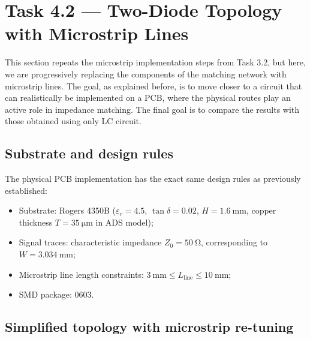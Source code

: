 
\section{Task 4.2 --- Two-Diode Topology with Microstrip Lines}
\label{sec:task4_2}

This section repeats the microstrip implementation steps from Task 3.2, but here, we are progressively replacing the components of the matching network with microstrip lines. The goal, as explained before, is to move closer to a circuit that can realistically be implemented on a PCB, where the physical routes play an active role in impedance matching. The final goal is to compare the results with those obtained using only LC circuit.

\subsection{Substrate and design rules}
\label{subsec:2d_design_rules}

The physical PCB implementation has the exact same design rules as previously established:
%
\begin{itemize}
    \item Substrate: Rogers 4350B ($\varepsilon_r = 4.5$,
          $\tan\delta = 0.02$, $H = \SI{1.6}{\milli\meter}$,
          copper thickness $T = \SI{35}{\micro\meter}$ in ADS model);
    \item Signal traces: characteristic impedance $Z_0 = \SI{50}{\ohm}$,
          corresponding to $W = \SI{3.034}{\milli\meter}$;
    \item Microstrip line length constraints:
          $\SI{3}{\milli\meter} \leq L_\mathrm{line} \leq \SI{10}{\milli\meter}$;
    \item SMD package: 0603.
\end{itemize}

\subsection{Simplified topology with microstrip re-tuning}
\label{subsec:2d_ms_tuning}

